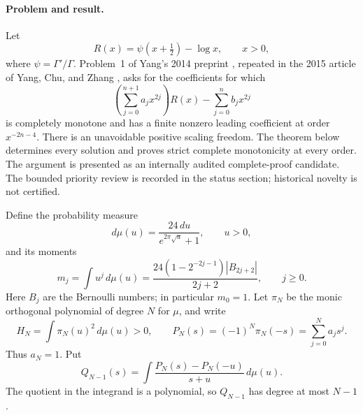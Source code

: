 \documentclass[11pt,a4paper]{article}
\theoremstyle{definition}
\theoremstyle{remark}
\numberwithin{equation}{section}
\begin{document}
\paragraph{Problem and result.}
Let
\[
 R(x)=\psi(x+\tfrac12)-\log x,\qquad x>0,
\]
where $\psi=\Gamma'/\Gamma$.
Problem~1 of Yang's 2014 preprint \cite{Yang2014}, repeated in the 2015 article of
Yang, Chu, and Zhang \cite{YangChuZhang2015}, asks for the coefficients for which
\[
 \left(\sum_{j=0}^{n+1}a_jx^{2j}\right)R(x)
       -\sum_{j=0}^{n}b_jx^{2j}
\]
is completely monotone and has a finite nonzero leading coefficient at
order $x^{-2n-4}$. There is an unavoidable positive scaling freedom.
The theorem below determines every solution and proves strict complete
monotonicity at every order. The argument is presented as an internally audited complete-proof candidate.
The bounded priority review is recorded in the status section; historical
novelty is not certified.

Define the probability measure
\begin{equation}\label{ya:mu}
 d\mu(u)=\frac{24\,du}{e^{2\pi\sqrt u}+1},\qquad u>0,
\end{equation}
and its moments
\begin{equation}\label{ya:moments}
 m_j=\int u^j\,d\mu(u)
 =\frac{24(1-2^{-2j-1})|B_{2j+2}|}{2j+2},\qquad j\ge0.
\end{equation}
Here $B_j$ are the Bernoulli numbers; in particular $m_0=1$.
Let $\pi_N$ be the monic orthogonal polynomial of degree $N$ for $\mu$,
and write
\[
 H_N=\int\pi_N(u)^2\,d\mu(u)>0,
 \qquad P_N(s)=(-1)^N\pi_N(-s)=\sum_{j=0}^Na_js^j.
\]
Thus $a_N=1$. Put
\begin{equation}\label{ya:Q}
 Q_{N-1}(s)=\int
       \frac{P_N(s)-P_N(-u)}{s+u}\,d\mu(u).
\end{equation}
The quotient in the integrand is a polynomial, so $Q_{N-1}$ has degree
at most $N-1$.
\end{document}
